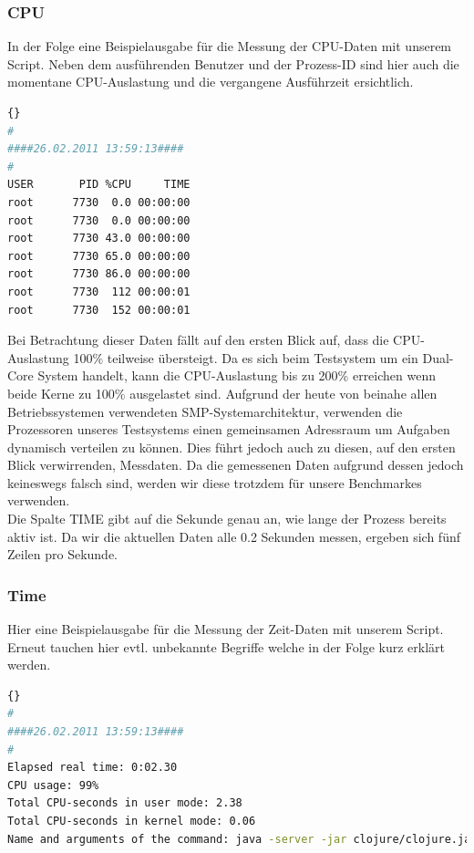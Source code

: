 \documentclass{fancydocument}
\begin{document}
\subsubsection{CPU}
In der Folge eine Beispielausgabe für die  Messung der CPU-Daten mit unserem Script. Neben dem ausführenden Benutzer und der Prozess-ID sind hier auch die momentane CPU-Auslastung und die vergangene Ausführzeit ersichtlich.

\noindent
\begin{minipage}{\textwidth}
\begin{lstlisting}[language=bash,caption=Speicherdaten]{}
#
####26.02.2011 13:59:13####
#
USER       PID %CPU     TIME
root      7730  0.0 00:00:00
root      7730  0.0 00:00:00
root      7730 43.0 00:00:00
root      7730 65.0 00:00:00
root      7730 86.0 00:00:00
root      7730  112 00:00:01
root      7730  152 00:00:01
\end{lstlisting}
\end{minipage}

Bei Betrachtung dieser Daten fällt auf den ersten Blick auf, dass die CPU-Auslastung 100\% teilweise übersteigt. Da es sich beim Testsystem um ein Dual-Core System handelt, kann die CPU-Auslastung bis zu 200\% erreichen wenn beide Kerne zu 100\% ausgelastet sind. Aufgrund der heute von beinahe allen Betriebssystemen verwendeten SMP-Systemarchitektur, verwenden die Prozessoren unseres Testsystems einen gemeinsamen Adressraum um Aufgaben dynamisch verteilen zu können. Dies führt jedoch auch zu diesen, auf den ersten Blick verwirrenden, Messdaten. Da die gemessenen Daten aufgrund dessen jedoch keineswegs falsch sind, werden wir diese trotzdem für unsere Benchmarkes verwenden.
\\
Die Spalte TIME gibt auf die Sekunde genau an, wie lange der Prozess bereits aktiv ist. Da wir die aktuellen Daten alle 0.2 Sekunden messen, ergeben sich fünf Zeilen pro Sekunde.

\subsubsection{Time}

Hier eine Beispielausgabe für die Messung der Zeit-Daten mit unserem Script. Erneut tauchen hier evtl. unbekannte Begriffe welche in der Folge kurz erklärt werden.

\noindent
\begin{minipage}{\textwidth}
\begin{lstlisting}[language=bash,caption=Speicherdaten]{}
#
####26.02.2011 13:59:13####
#
Elapsed real time: 0:02.30
CPU usage: 99%
Total CPU-seconds in user mode: 2.38
Total CPU-seconds in kernel mode: 0.06
Name and arguments of the command: java -server -jar clojure/clojure.jar
\end{lstlisting}
\end{minipage}
\end{document}
